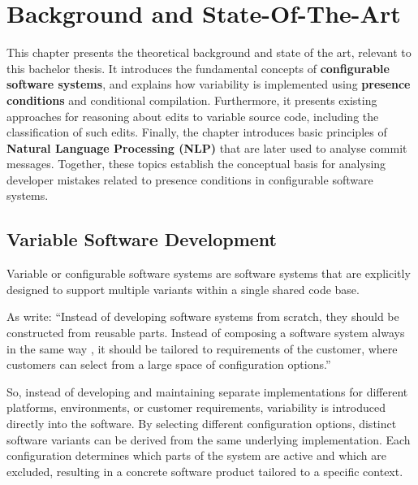 \chapter{Background and State-Of-The-Art}
\label{chp:background}
This chapter presents the theoretical background and state of the art, relevant to this bachelor thesis. It introduces the fundamental concepts of \textbf{configurable software systems}, and explains how variability is implemented using \textbf{presence conditions} and conditional compilation. Furthermore, it presents existing approaches for reasoning about edits to variable source code, including the classification of such edits. Finally, the chapter introduces basic principles of \textbf{Natural Language Processing (NLP)} that are later used to analyse commit messages. Together, these topics establish the conceptual basis for analysing developer mistakes related to presence conditions in configurable software systems.

\section{Variable Software Development}
\label{sec:background_jolie_syntax}


Variable or configurable software systems are software systems that are explicitly designed to support multiple variants within a single shared code base.

As \textcite{apel2013_featureOrientedSoftwareProductLines} write:
``Instead of developing software systems from scratch, they should be constructed from reusable parts. Instead of composing a software system always in the same way , it should be tailored to requirements of the customer, where customers can select from a large space of configuration options.'' \parencite{apel2013_featureOrientedSoftwareProductLines}

So, instead of developing and maintaining separate implementations for different platforms, environments, or customer requirements, variability is introduced directly into the software. By selecting different configuration options, distinct software variants can be derived from the same underlying implementation. Each configuration determines which parts of the system are active and which are excluded, resulting in a concrete software product tailored to a specific context. \parencite{apel2013_featureOrientedSoftwareProductLines}

